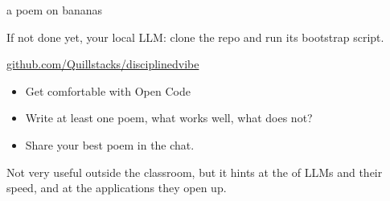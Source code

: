 \begin{frame}{ a poem on bananas}
  \begin{sidebody}
    If not done yet,  your local LLM: clone the repo and run its bootstrap script.\par\smallskip
    {\small\href{https://github.com/Quillstacks/disciplinedvibe}{github.com/Quillstacks/disciplinedvibe}}
    \vspace{0.5em}
    \begin{itemize}
      \item Get comfortable with Open Code
      \item Write at least one poem, what works well, what does not?
      \item Share your best poem in the chat.
    \end{itemize}
    
    \vspace{1.5em}
    Not very useful outside the classroom, but it hints at the  of LLMs and their speed, and
    at the applications they open up.   
  \end{sidebody}
  
\end{frame}






